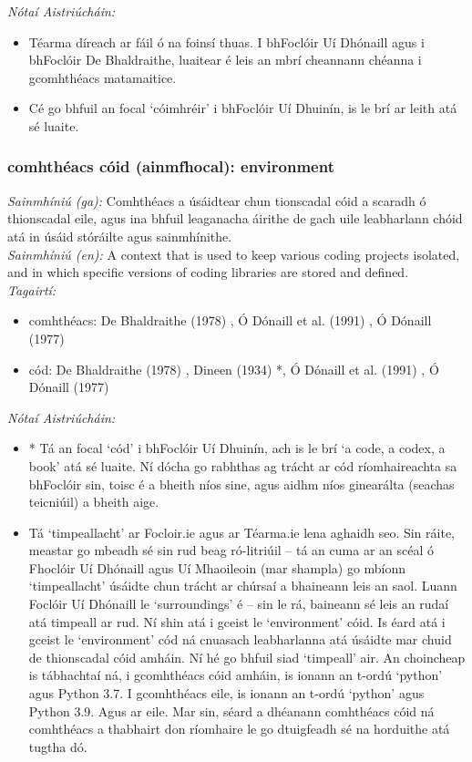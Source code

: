 \documentclass{article}
\begin{document}
 \noindent \textit{Nótaí Aistriúcháin:}
\begin{itemize}
	\item Téarma díreach ar fáil ó na foinsí thuas. I bhFoclóir Uí Dhónaill agus i bhFoclóir De Bhaldraithe, luaitear é leis an mbrí cheannann chéanna i gcomhthéacs matamaitice.
	\item Cé go bhfuil an focal `cóimhréir' i bhFoclóir Uí Dhuinín, is le brí ar leith atá sé luaite.
\end{itemize}


\subsubsection*{comhthéacs cóid (ainmfhocal): environment}
 \noindent \textit{Sainmhíniú (ga):} Comhthéacs a úsáidtear chun tionscadal cóid a scaradh ó thionscadal eile, agus ina bhfuil leaganacha áirithe de gach uile leabharlann chóid atá in úsáid stóráilte agus sainmhínithe.
\\
 \noindent \textit{Sainmhíniú (en):} A context that is used to keep various coding projects isolated, and in which specific versions of coding libraries are stored and defined.
\\
 \noindent \textit{Tagairtí:}
\begin{itemize}
	\item comhthéacs: De Bhaldraithe (1978) \cite{de-bhaldraithe}, Ó Dónaill et al. (1991) \cite{focloir-beag}, Ó Dónaill (1977) \cite{odonaill}
	\item cód: De Bhaldraithe (1978) \cite{de-bhaldraithe}, Dineen (1934) \cite{dineen}*, Ó Dónaill et al. (1991) \cite{focloir-beag}, Ó Dónaill (1977) \cite{odonaill}
\end{itemize}

 \noindent \textit{Nótaí Aistriúcháin:}
\begin{itemize}
	\item * Tá an focal `cód' i bhFoclóir Uí Dhuinín, ach is le brí `a code, a codex, a book' atá sé luaite. Ní dócha go rabhthas ag trácht ar cód ríomhaireachta sa bhFoclóir sin, toisc é a bheith níos sine, agus aidhm níos ginearálta (seachas teicniúil) a bheith aige.
	\item Tá `timpeallacht' ar Focloir.ie agus ar Téarma.ie lena aghaidh seo. Sin ráite, meastar go mbeadh sé sin rud beag ró-litriúil -- tá an cuma ar an scéal ó Fhoclóir Uí Dhónaill agus Uí Mhaoileoin (mar shampla) go mbíonn `timpeallacht' úsáidte chun trácht ar chúrsaí a bhaineann leis an saol. Luann Foclóir Uí Dhónaill le `surroundings' é -- sin le rá, baineann sé leis an rudaí atá timpeall ar rud. Ní shin atá i gceist le `environment' cóid. Is éard atá i gceist le `environment' cód ná cnuasach leabharlanna atá úsáidte mar chuid de thionscadal cóid amháin. Ní hé go bhfuil siad `timpeall' air. An choincheap is tábhachtaí ná, i gcomhthéacs cóid amháin, is ionann an t-ordú `python' agus Python 3.7. I gcomhthéacs eile, is ionann an t-ordú `python' agus Python 3.9. Agus ar eile. Mar sin, séard a dhéanann comhthéacs cóid ná comhthéacs a thabhairt don ríomhaire le go dtuigfeadh sé na horduithe atá tugtha dó.
\end{itemize}
\end{document}
